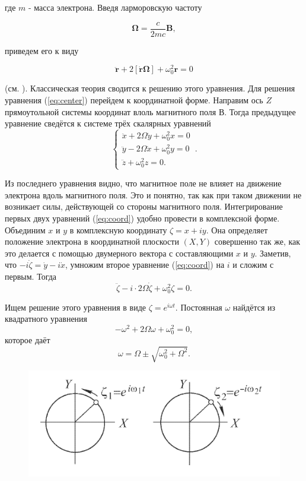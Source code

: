 \documentclass[12pt]{article}
\begin{document}
  где $m$ - масса электрона. Введя ларморовскую частоту

  \begin{equation}
  \boldsymbol{\Omega}=\frac{c}{2 m c} \mathbf{B},
  \label{eq:larm}
  \end{equation}


  приведем его к виду

  \begin{equation}
  \ddot{\mathbf{r}}+2[\dot{\mathbf{r}} \boldsymbol{\Omega}]+\omega_0^2 \mathbf{r}=0
  \label{eq:center}
  \end{equation}

  (см. \cite[\S 86]{sivykhin3}). Классическая теория сводится к решению этого уравнения. Для решения уравнения (\ref{eq:center}) перейдем к координатной форме. Направим ось $Z$ прямоутольной системы координат влоль магнитного поля В. Тогда предыдущее уравнение сведётся к системе трёх скалярных уравнений
  \begin{equation}
  \begin{cases}
  \ddot{x} + 2\Omega \dot{y} + \omega_0^2 x = 0 \\
  \ddot{y} - 2\Omega \dot{x} + \omega_0^2 y = 0 \\
  \ddot{z} + \omega_0^2 z = 0.
  \end{cases}\,.
  \label{eq:coord}
  \end{equation}

  Из последнего уравнения видно, что магнитное поле не влияет на движение электрона вдоль магнитного поля. Это и понятно, так как при таком движении не возникает силы, действующей со стороны магнитного поля. Интегрирование первых двух уравнений (\ref{eq:coord}) удобно провести в комплексной форме. Объединим $x$ и $y$ в комплексную координату $\zeta = x + iy$. Она определяет положение электрона в координатной плоскости $(X, Y)$ совершенно так же, как это делается с помощью двумерного вектора с составляющими $x$ и $y$. Заметив, что $-i\dot{\zeta} = \dot{y} - i\dot{x}$, умножим второе уравнение (\ref{eq:coord}) на $i$ и сложим с первым. Тогда
  \[
  \ddot{\zeta} - i \cdot 2\Omega \dot{\zeta} + \omega_0^2 \zeta = 0.
  \]

  Ищем решение этого уравнения в виде $\zeta = e^{i\omega t}$. Постоянная $\omega$ найдётся из квадратного уравнения
  \[
  -\omega^2 + 2\Omega \omega + \omega_0^2 = 0,
  \]
  которое даёт
  \[
  \omega = \Omega \pm \sqrt{\omega_0^2 + \Omega^2}.
  \]

  \begin{figure}
    \centering
    \includegraphics[]{circle.png}
    \caption{}
    \label{fig:circle}
  \end{figure}
\end{document}
